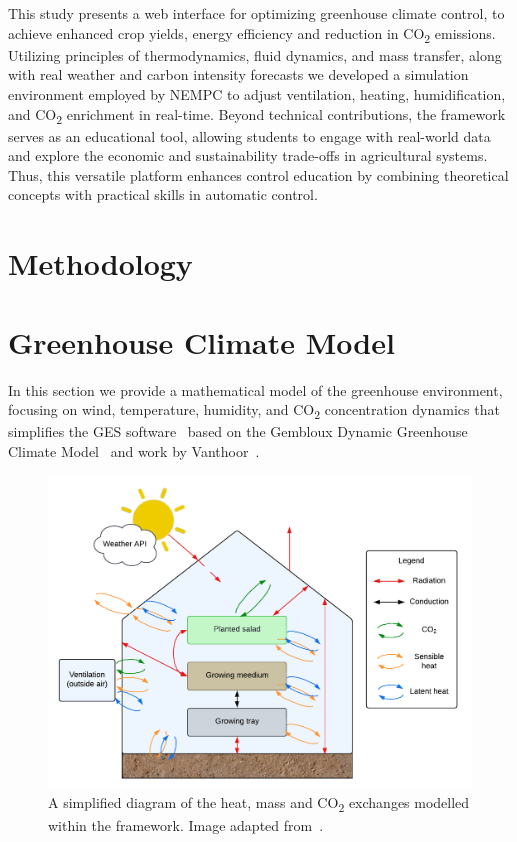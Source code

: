 \documentclass[conference]{IEEEtran}
\begin{document}
This study presents a web interface for optimizing greenhouse climate control, to achieve enhanced crop yields, energy efficiency and reduction in CO\textsubscript{2} emissions. Utilizing principles of thermodynamics, fluid dynamics, and mass transfer, along with real weather and carbon intensity forecasts we developed a simulation environment employed by NEMPC to adjust ventilation, heating, humidification, and CO\textsubscript{2} enrichment in real-time. Beyond technical contributions, the framework serves as an educational tool, allowing students to engage with real-world data and explore the economic and sustainability trade-offs in agricultural systems. Thus, this versatile platform enhances control education by combining theoretical concepts with practical skills in automatic control.

\section{Methodology}\label{sec:methodology}

\section{Greenhouse Climate Model}\label{sec:greenhouse}
In this section we provide a mathematical model of the greenhouse environment, focusing on wind, temperature, humidity, and CO\textsubscript{2} concentration dynamics that
simplifies the GES software~\cite{rmward61_2019} based on the Gembloux Dynamic Greenhouse Climate Model~\cite{GDGCM} and work by Vanthoor~\cite{Vanthoor2011}.

\begin{figure}
    \centering
    \includegraphics[width=.5\textwidth]{images/diagram.pdf}
    \caption{A simplified diagram of the heat, mass and CO\textsubscript{2} exchanges modelled within the framework. Image adapted from~\cite{rmward61_2019}.}\label{fig:diagram}
\end{figure}
\end{document}
